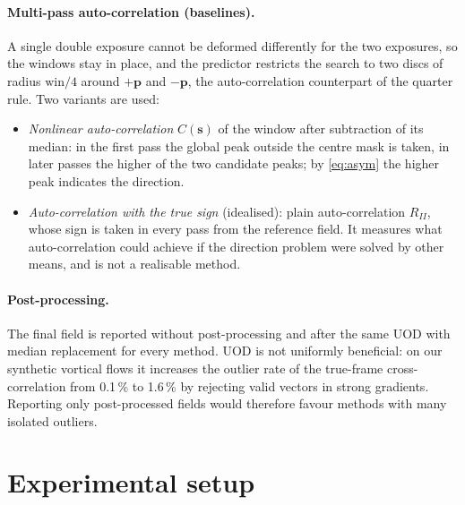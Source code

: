 \documentclass[11pt]{article}
\theoremstyle{remark}
\newcommand{\s}{\mathbf{s}}
\newcommand{\p}{\mathbf{p}}
\begin{document}
\paragraph{Multi-pass auto-correlation (baselines).}
A single double exposure cannot be deformed differently for the two exposures, so the windows stay in place, and the predictor restricts the search to two discs of radius $\mathrm{win}/4$ around $+\p$ and $-\p$, the auto-correlation counterpart of the quarter rule. Two variants are used:
\begin{itemize}
\item \emph{Nonlinear auto-correlation} $C(\s)$ of the window after subtraction of its median: in the first pass the global peak outside the centre mask is taken, in later passes the higher of the two candidate peaks; by \eqref{eq:asym} the higher peak indicates the direction.
\item \emph{Auto-correlation with the true sign} (idealised): plain auto-correlation $R_{II}$, whose sign is taken in every pass from the reference field. It measures what auto-correlation could achieve if the direction problem were solved by other means, and is not a realisable method.
\end{itemize}

\paragraph{Post-processing.}
The final field is reported without post-processing and after the same UOD with median replacement for every method.
UOD is not uniformly beneficial: on our synthetic vortical flows it increases the outlier rate of the true-frame cross-correlation from 0.1\,\% to 1.6\,\% by rejecting valid vectors in strong gradients. Reporting only post-processed fields would therefore favour methods with many isolated outliers.

\section{Experimental setup}\label{sec:setup}
\end{document}
